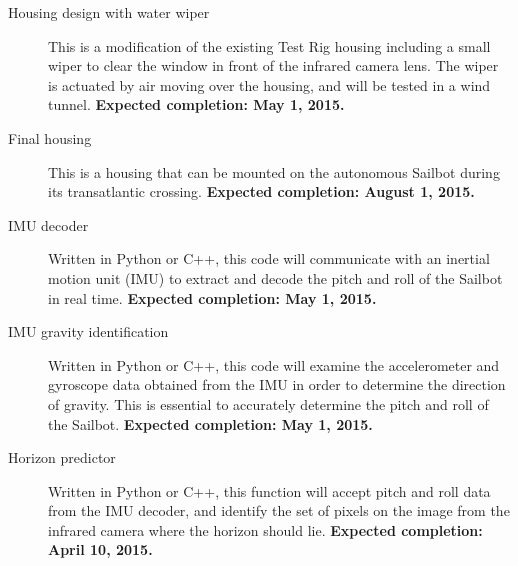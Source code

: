 
\iffalse
Guideline:
Ongoing commitments by team members.
This section explicitly states any ongoing commitments that the team members have made to the project after submitting the final report. This list is expected to be made in consultation with the Project Sponsor. It is desirable to make the items in this section as specific as possible, and to include a target end-date for the commitment.

Commitment notes:
Riley: final housing design, wind tunnel testing of wiper [End of April]
Kiel: join the team, IMU processing software (map imu data to pitch and roll, find gravity to zero-out gyro) [End of April for IMU]
\fi

\begin{description}
\item[Housing design with water wiper] This is a modification of the existing Test Rig housing including a small wiper to clear the window in front of the infrared camera lens. The wiper is actuated by air moving over the housing, and will be tested in a wind tunnel. \textbf{Expected completion: May 1, 2015.}
\item[Final housing] This is a housing that can be mounted on the autonomous Sailbot during its transatlantic crossing. \textbf{Expected completion: August 1, 2015.}
\item[IMU decoder] Written in Python or C++, this code will communicate with an inertial motion unit (IMU) to extract and decode the pitch and roll of the Sailbot in real time. \textbf{Expected completion: May 1, 2015.}
\item[IMU gravity identification] Written in Python or C++, this code will examine the accelerometer and gyroscope data obtained from the IMU in order to determine the direction of gravity. This is essential to accurately determine the pitch and roll of the Sailbot. \textbf{Expected completion: May 1, 2015.}
\item[Horizon predictor] Written in Python or C++, this function will accept pitch and roll data from the IMU decoder, and identify the set of pixels on the image from the infrared camera where the horizon should lie. \textbf{Expected completion: April 10, 2015.}
\end{description}
